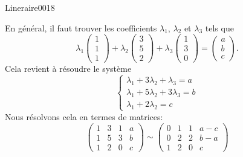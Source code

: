 \begin{corrige}{Lineraire0018}

	En général, il faut trouver les coefficients $\lambda_1$, $\lambda_2$ et $\lambda_3$ tels que
	\begin{equation}
		\lambda_1\begin{pmatrix}
			1	\\ 
			1	\\ 
			1	
		\end{pmatrix}+
		\lambda_2\begin{pmatrix}
			3	\\ 
			5	\\ 
			2	
		\end{pmatrix}+
		\lambda_3\begin{pmatrix}
			1	\\ 
			3	\\ 
			0	
		\end{pmatrix}
		=
		\begin{pmatrix}
			a	\\ 
			b	\\ 
			c	
		\end{pmatrix}.
	\end{equation}
	Cela revient à résoudre le système
	\begin{equation}
		\left\{
		\begin{array}{ll}
			\lambda_1+3\lambda_2+\lambda_3=a\\
			\lambda_1+5\lambda_2+3\lambda_3=b\\
			\lambda_1+2\lambda_2=c
		\end{array}
		\right.
	\end{equation}
	Nous résolvons cela en termes de matrices:
	\begin{equation}
		\left(\begin{array}{ccc|c}
			 1	&	3	&	1	&	a	\\
			  1	&	5	&	3	&	b\\
			   1	&	2	&	0	&	c	 
		   \end{array}\right)
		   \sim
		   \left(\begin{array}{ccc|c}
			    0	&	1	&	1	&	a-c	\\
			     0	&	2	&	2	&	b-a\\
			      1	&	2	&	0	&	c	 
		      \end{array}\right)
	\end{equation}

\end{corrige}
